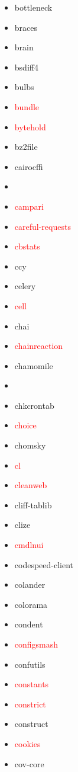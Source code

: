 \documentclass{l4proj}
\begin{document}
\begin{appendices}
{\begin{itemize}
\item bottleneck
\item braces
\item brain
\item bsdiff4
\item bulbs
\item\textcolor{red}{bundle}
\item\textcolor{red}{bytehold}
\item bz2file
\item cairocffi
\item\textcolor{red}{}
\item\textcolor{red}{campari}
\item\textcolor{red}{careful-requests}
\item\textcolor{red}{cbstats}
\item ccy
\item celery
\item\textcolor{red}{cell}
\end{itemize}
}%
\clearpage
\noindent\parbox[t]{0.32\textwidth}{\raggedright%
\begin{itemize}
\item chai
\item\textcolor{red}{chainreaction}
\item chamomile
\item {}
\item chkcrontab
\item\textcolor{red}{choice}
\item chomsky
\item\textcolor{red}{cl}
\item\textcolor{red}{cleanweb}
\item cliff-tablib
\item clize
\item\textcolor{red}{cmdlnui}
\item codespeed-client
\item colander
\item colorama
\item condent
\item\textcolor{red}{configsmash}
\item confutils
\item\textcolor{red}{constants}
\item\textcolor{red}{constrict}
\item construct
\item\textcolor{red}{cookies}
\item cov-core

\end{itemize}}
\end{appendices}
\end{document}
